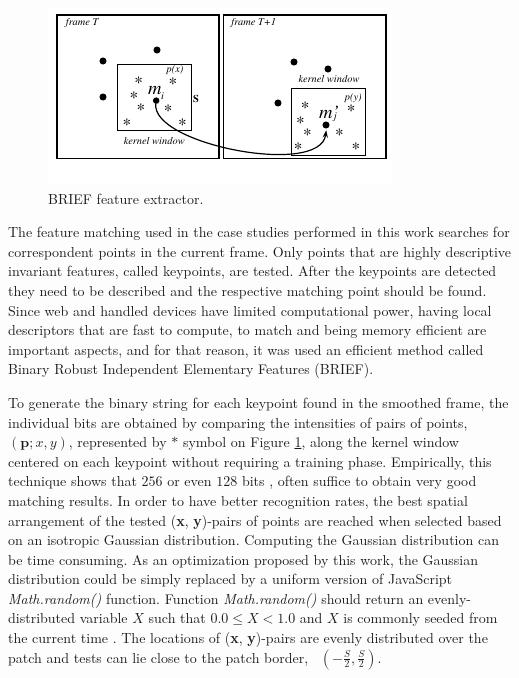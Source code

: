 \begin{figure}[!htb]
  \centering
  \includegraphics[width=\linewidth]{chapters/tracking_library_for_the_web/BRIEF.pdf}
  \caption{BRIEF \cite{Lepetit2005} feature extractor.}
  \label{figure:BRIEF}
\end{figure}

The feature matching used in the case studies performed in this work searches for correspondent points in the current frame. Only points that are highly descriptive invariant features, called keypoints, are tested. After the keypoints are detected they need to be described and the respective matching point should be found. Since web and handled devices have limited computational power, having local descriptors that are fast to compute, to match and being memory efficient are important aspects, and for that reason, it was used an efficient method called Binary Robust Independent Elementary Features (BRIEF).

To generate the binary string for each keypoint found in the smoothed frame, the individual bits are obtained by comparing the intensities of pairs of points, $(\textbf{p}; x, y)$, represented by $\ast$ symbol on Figure \ref{figure:BRIEF}, along the kernel window centered on each keypoint without requiring a training phase.
Empirically, this technique shows that $256$ or even $128$ bits \cite{Calonder2010}, often suffice to obtain very good matching results. In order to have better recognition rates, the best spatial arrangement of the tested (\textbf{x}, \textbf{y})-pairs of points are reached when selected based on an isotropic Gaussian distribution. Computing the Gaussian distribution can be time consuming. As an optimization proposed by this work, the Gaussian distribution could be simply replaced by a uniform version of JavaScript \textit{Math.random()} function. Function \textit{Math.random()} should return an evenly-distributed variable $X$ such that $0.0 \le X < 1.0$ and $X$ is commonly seeded from the current time \cite{International2009}. The locations of (\textbf{x}, \textbf{y})-pairs are evenly distributed over the patch and tests can lie close to the patch border, \ie\ $(-\frac{S}{2},\frac{S}{2})$.

